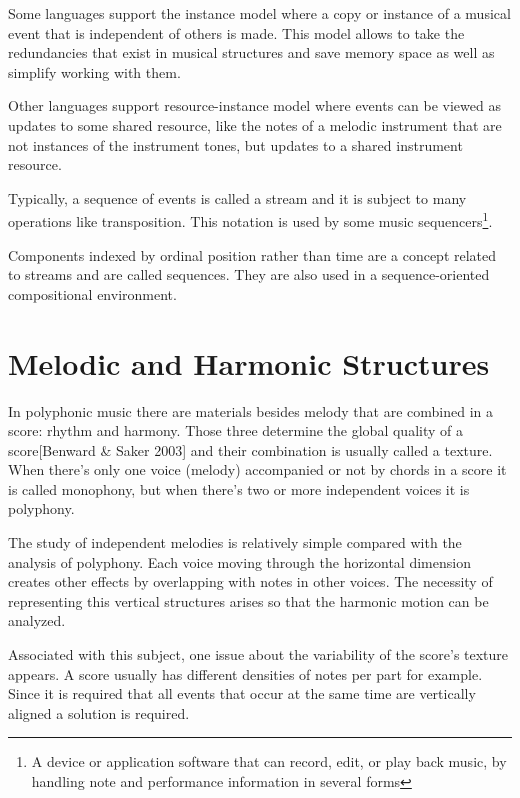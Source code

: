 \documentclass[main.tex]{files}
\begin{document}
    Some languages support the instance model where a copy or instance of a musical event that
    is independent of others is made. This model allows to take the redundancies that exist in
    musical structures and save memory space as well as simplify working with them.

    Other languages support resource-instance model\cite{Dannenberg1991} where events can be viewed
    as updates to some shared resource, like the notes of a melodic instrument that are not instances
    of the instrument tones, but updates to a shared instrument resource.

    Typically, a sequence of events is called a stream and it is subject to many operations like
    transposition. This notation is used by some music sequencers\footnote{A device or application
    software that can record, edit, or play back music, by handling note and performance information
    in several forms}.

    Components indexed by ordinal position rather than time are a concept related to streams
    and are called sequences. They are also used in a sequence-oriented compositional environment.
    

\section{Melodic and Harmonic Structures} 

In polyphonic music there are materials besides melody that are combined in a score: rhythm
and harmony. Those three determine the global quality of a score[Benward \& Saker 2003] and their
combination is usually called a texture. When there's only one voice (melody) accompanied or not
by chords in a score it is called monophony, but when there's two or more independent voices
it is polyphony.

The study of independent melodies is relatively simple compared with the analysis
of polyphony. Each voice moving through the horizontal dimension creates other effects by
overlapping with notes in other voices. The necessity of representing this vertical structures
arises so that the harmonic motion can be analyzed.

Associated with this subject, one issue about the variability of the score's texture appears. A score
usually has different densities of notes per part for example. Since it is required that all
events that occur at the same time are vertically aligned a solution is required.
\end{document}
